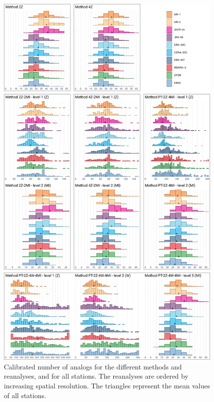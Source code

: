 \documentclass[alpha-refs]{wiley-article}
\begin{document}
\begin{figure}[btp]
	\centering
	\includegraphics[width=115mm]{figure-3.pdf}
	\caption{Calibrated number of analogs for the different methods and reanalyses, and for all stations. The reanalyses are ordered by increasing spatial resolution. The triangles represent the mean values of all stations.}
	\label{fig:params-nb-analogs}
\end{figure}
\end{document}
